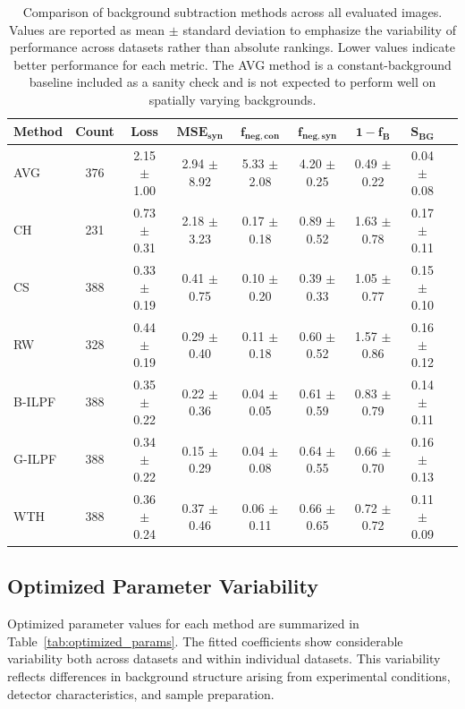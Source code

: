 \documentclass[iucr]{iucrjournals}
\begin{document}
\begin{table}[t]
\caption{Comparison of background subtraction methods across all evaluated images. Values are reported as mean $\pm$ standard deviation to emphasize the variability of performance across datasets rather than absolute rankings. Lower values indicate better performance for each metric. The AVG method is a constant-background baseline included as a sanity check and is not expected to perform well on spatially varying backgrounds.}
\label{tab:method_performance_new}
\centering
\small
\setlength{\tabcolsep}{3pt}
\renewcommand{\arraystretch}{1.1}
\begin{tabular}{@{}lcccccccc@{}}
\toprule
\textbf{Method} & \textbf{Count} & \textbf{Loss} &
$\mathbf{MSE}_{\mathbf{syn}}$ &
$\mathbf{f}_{\mathbf{neg,con}}$ &
$\mathbf{f}_{\mathbf{neg,syn}}$ &
$\mathbf{1-f_B}$ &
$\mathbf{S}_{\mathbf{BG}}$ \\ \midrule
AVG & 376 & 2.15 $\pm$ 1.00 & 2.94 $\pm$ 8.92 & 5.33 $\pm$ 2.08 & 4.20 $\pm$ 0.25 & 0.49 $\pm$ 0.22 & 0.04 $\pm$ 0.08 \\
CH & 231 & 0.73 $\pm$ 0.31 & 2.18 $\pm$ 3.23 & 0.17 $\pm$ 0.18 & 0.89 $\pm$ 0.52 & 1.63 $\pm$ 0.78 & 0.17 $\pm$ 0.11 \\
CS & 388 & 0.33 $\pm$ 0.19 & 0.41 $\pm$ 0.75 & 0.10 $\pm$ 0.20 & 0.39 $\pm$ 0.33 & 1.05 $\pm$ 0.77 & 0.15 $\pm$ 0.10 \\
RW & 328 & 0.44 $\pm$ 0.19 & 0.29 $\pm$ 0.40 & 0.11 $\pm$ 0.18 & 0.60 $\pm$ 0.52 & 1.57 $\pm$ 0.86 & 0.16 $\pm$ 0.12 \\
B-ILPF & 388 & 0.35 $\pm$ 0.22 & 0.22 $\pm$ 0.36 & 0.04 $\pm$ 0.05 & 0.61 $\pm$ 0.59 & 0.83 $\pm$ 0.79 & 0.14 $\pm$ 0.11 \\
G-ILPF & 388 & 0.34 $\pm$ 0.22 & 0.15 $\pm$ 0.29 & 0.04 $\pm$ 0.08 & 0.64 $\pm$ 0.55 & 0.66 $\pm$ 0.70 & 0.16 $\pm$ 0.13 \\
WTH & 388 & 0.36 $\pm$ 0.24 & 0.37 $\pm$ 0.46 & 0.06 $\pm$ 0.11 & 0.66 $\pm$ 0.65 & 0.72 $\pm$ 0.72 & 0.11 $\pm$ 0.09 \\
\bottomrule
\end{tabular}
\end{table}




\subsection{Optimized Parameter Variability}

Optimized parameter values for each method are summarized in Table~\ref{tab:optimized_params}. The fitted coefficients show considerable variability both across datasets and within individual datasets. This variability reflects differences in background structure arising from experimental conditions, detector characteristics, and sample preparation.
\end{document}
